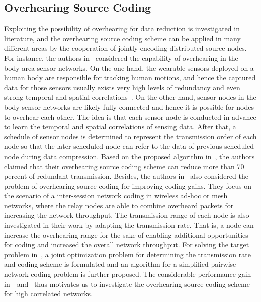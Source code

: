 \subsection{Overhearing Source Coding}
Exploiting the possibility of overhearing for data reduction is investigated in literature, and the overhearing source coding scheme can be applied in many different areas by the cooperation of jointly encoding distributed source nodes.
%
For instance, the authors in~\cite{BodyAreaSensorNetwork} considered the capability of overhearing in the body-area sensor networks.
On the one hand, the wearable sensors deployed on a human body are responsible for tracking human motions, and hence the captured data for those sensors usually exists very high levels of redundancy and even strong temporal and spatial correlations~\cite{SpatialCorrInBodySensorNetwork}.
On the other hand, sensor nodes in the body-sensor networks are likely fully connected and hence it is possible for nodes to overhear each other.
The idea is that each sensor node is conducted in advance to learn the temporal and spatial correlations of sensing data.
After that, a schedule of sensor nodes is determined to represent the transmission order of each node so that the later scheduled node can refer to the data of previous scheduled node during data compression.
Based on the proposed algorithm in~\cite{BodyAreaSensorNetwork}, the authors claimed that their overhearing source coding scheme can reduce more than 70 percent of redundant transmission.
%
Besides, the authors in~\cite{InterSessionCoding} also considered the problem of overhearing source coding for improving coding gains.
They focus on the scenario of a inter-session network coding in wireless ad-hoc or mesh networks, where the relay nodes are able to combine overheard packets for increasing the network throughput.
The transmission range of each node is also investigated in their work by adapting the transmission rate.
That is, a node can increase the overhearing range for the sake of enabling additional opportunities for coding and increased the overall network throughput.
For solving the target problem in~\cite{InterSessionCoding}, a joint optimization problem for determining the transmission rate and coding scheme is formulated and an algorithm for a simplified pairwise network coding problem is further proposed.
%
The considerable performance gain in~\cite{BodyAreaSensorNetwork}~and~\cite{InterSessionCoding} thus motivates us to investigate the overhearing source coding scheme for high correlated networks.
%
